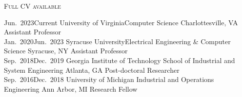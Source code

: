 \documentclass[localFont,alternative]{documentMETADATA}
\begin{document}
\makecvheader\sloppy\allowdisplaybreaks


	\makecvfooter
		{\textsc{}} %
		{\textsc{Full CV available  }}
		{\thepage}



\vspace{-6pt}
\begin{experiences}
  \job
    {Jun.~2023}{Current}
    {University of Virginia}{Computer Science}
    {Charlottesville, VA}
    {Assistant Professor}\\[-10pt]

  \job
    {Jan.~2020}{Jun.~2023}
    {Syracuse University}{Electrical Engineering \& Computer Science}
    {Syracuse, NY}
    {Assistant Professor}\\[-10pt]

  \job
    {Sep.~2018}{Dec.~2019}
    {Georgia Institute of Technology}
    {School of Industrial and System Engineering}
    {Atlanta, GA}
    {Post-doctoral Researcher}\\[-10pt]
  \job
    {Sep.~2016}{Dec.~2018}
    {University of Michigan}
    {Industrial and Operations Engineering}
    {Ann Arbor, MI}
    {Research Fellow}
    
\end{experiences}

\vspace{-2pt}
\vspace{-6pt}
\end{document}
